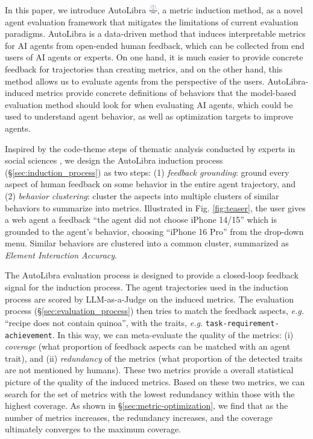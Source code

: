 In this paper, we introduce AutoLibra \protect\includegraphics[height=1em]{figs/scale.png},
a metric induction method, as a novel agent evaluation framework
that mitigates the limitations of current evaluation paradigms.
AutoLibra is a data-driven method that induces interpretable metrics for AI agents
from open-ended human feedback, which can be collected
from end users of AI agents or experts. 
On one hand, it is much easier to provide concrete feedback for trajectories than creating metrics, and on the other hand, this method allows us to evaluate agents from the perspective of the users. 
AutoLibra-induced metrics provide concrete definitions of behaviors that the model-based evaluation method should look for
when evaluating AI agents, which could be used to understand agent behavior,
as well as optimization targets to improve agents.



Inspired by the code-theme steps of thematic analysis conducted by experts
in social sciences \citep{braun2006using},
we design the AutoLibra induction process (\S\ref{sec:induction_process}) as two steps:
(1) \emph{feedback grounding}: ground every aspect of human feedback on some behavior in the entire agent trajectory,
and (2) \emph{behavior clustering}: cluster the aspects into multiple clusters of similar behaviors to summarize into metrics. Illustrated in Fig. \ref{fig:teaser}, the user gives a web agent a feedback ``the agent did not choose iPhone 14/15'' which is grounded to the agent's behavior, choosing ``iPhone 16 Pro'' from the drop-down menu. Similar behaviors are clustered into a common cluster, summarized as \textit{Element Interaction Accuracy}. 


The AutoLibra evaluation process is designed to provide a closed-loop feedback signal for the induction process. 
The agent trajectories used in the induction process are scored by LLM-as-a-Judge \citep{zheng2023judging}
on the induced metrics. The evaluation process (\S\ref{sec:evaluation_process}) then tries to match the feedback aspects,
\emph{e.g.} ``recipe does not contain quinoa'', with the traits, \emph{e.g.} \texttt{task-requirement-achievement}.
In this way, we can meta-evaluate the quality of the metrics: (i) \emph{coverage} (what proportion of feedback aspects can be matched with an agent trait), and (ii) \emph{redundancy} of the metrics
(what proportion of the detected traits are not mentioned by humans). These two metrics provide a overall statistical picture of the quality of the induced metrics. Based on these two metrics, we can search for the set of metrics with the lowest redundancy within those with the highest coverage. As shown in \S\ref{sec:metric-optimization}, we find that as the number of metrics increases, the redundancy increases, and the coverage ultimately converges to the maximum coverage.



